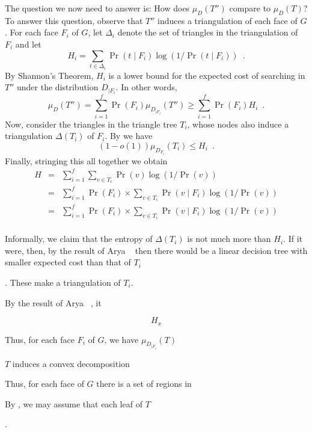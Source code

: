 \documentclass[charterfonts,lotsofwhite]{patmorin}
\begin{document}
The question we now need to answer is: How does $\mu_D(T'')$ compare
to $\mu_D(T)$?  To answer this question, observe that $T''$ induces a
triangulation of each face of $G$. For each face $F_i$ of $G$, let
$\Delta_i$ denote the set of triangles in the triangulation of $F_i$
and let 
\[
   H_i=\sum_{t\in\Delta_i} \Pr(t\mid F_i)\log(1/\Pr(t\mid F_i)) \enspace .
\]
By Shannon's Theorem, $H_i$ is a lower bound for the expected cost of
searching in $T''$ under the distribution $D_{|F_i}$.  In other words,
\[
    \mu_D(T'') = \sum_{i=1}^f \Pr(F_i)\mu_{D_{|F_i}}(T'') \ge \sum_{i=1}^f \Pr(F_i)H_i \enspace .
\]
Now, consider the triangles in the triangle tree $T_i$, whose nodes
also induce a triangulation $\Delta(T_i)$ of $F_i$.  
By  we have
\[
    (1-o(1))\mu_{D_{F_i}}(T_i) \le H_i \enspace .
\]
Finally, stringing this all together we obtain
\begin{eqnarray*}
  H &=& \sum_{i=1}^f\sum_{v\in T_i} \Pr(v)\log(1/\Pr(v)) \\
    &=& \sum_{i=1}^f\Pr(F_i)\times 
        \sum_{v\in T_i} \Pr(v\mid F_i)\log(1/\Pr(v)) \\
    &=& \sum_{i=1}^f\Pr(F_i)\times \sum_{v\in T_i} \Pr(v\mid F_i)\log(1/\Pr(v)) \\
\end{eqnarray*}

Informally, we
claim that the entropy of $\Delta(T_i)$ is not much more than $H_i$.
If it were, then, by the result of Arya \etal\ \cite{ammw07} then
there would be a linear decision tree with smaller expected cost than
that of $T_i$


.  These make a
triangulation of $T_i$.




By the result of Arya \etal\ \cite{ammw07}, it 

\[
    H_x
\]



Thus, for each face
$F_i$ of $G$, we have $\mu_{D_{|F_i}}(T)$

$T$ induces a convex decomposition


  Thus, for each face
of $G$ there is a set of regions in 

By , we may assume that each leaf of $T$

\cite{ammw07,i01}.
\end{document}
